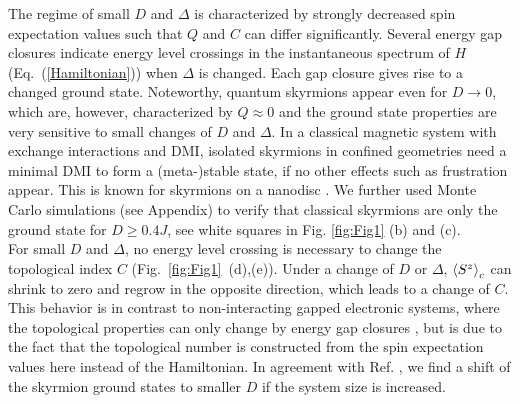 \documentclass[reprint,aps,prb,superscriptaddress,10pt]{revtex4-2} %
\begin{document}
The regime of small $D$ and $\Delta$ is characterized by strongly decreased spin expectation values such that $Q$ and $C$ can differ significantly. Several energy gap closures indicate energy level crossings in the instantaneous spectrum of $H$ (Eq.~(\ref{Hamiltonian})) when $\Delta$ is changed. Each gap closure gives rise to a changed ground state.
Noteworthy, quantum skyrmions appear even for $D\rightarrow0$, which are, however, characterized by  $Q\approx0$ and the ground state properties are very sensitive to small changes of $D$ and $\Delta$.
In a classical magnetic system with exchange interactions and DMI, isolated skyrmions in confined geometries need a minimal DMI to form a (meta-)stable state, if no other effects such as frustration appear. This is known for skyrmions on a nanodisc \cite{Sampaio2013}. We further used Monte Carlo simulations (see Appendix) to verify that classical skyrmions are only the ground state for $D\geq0.4J$, see white squares in Fig. \ref{fig:Fig1} (b) and (c). \\
For small $D$ and $\Delta$, no energy level crossing is necessary to change the 
topological index $C$ (Fig.~\ref{fig:Fig1}~(d),(e)). 
Under a change of $D$ or $\Delta$, $\braket{S^z}_c$ can shrink to zero and regrow in the opposite direction, which leads to a change of $C$.
This behavior is in contrast to non-interacting gapped electronic systems, where the topological properties can only change by energy gap closures \cite{Ryu2010}, but is due to the fact that the topological number is constructed from the spin expectation values here instead of the Hamiltonian.
In agreement with Ref. \cite{Gauyacq2019a}, we find a shift of the skyrmion ground states to smaller $D$ if the system size is increased.\\
\end{document}
